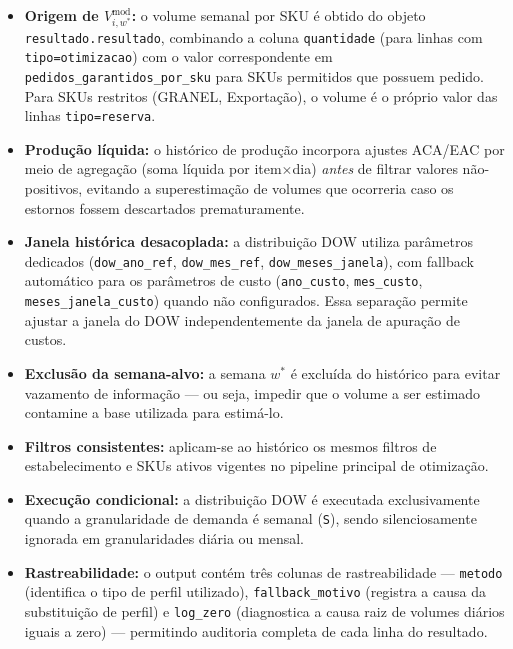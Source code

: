 \documentclass[11pt,a4paper]{article}
\begin{document}
\begin{itemize}
    \item \textbf{Origem de $V^{\text{mod}}_{i,w^*}$:} o volume semanal por
        SKU é obtido do objeto \texttt{resultado.resultado}, combinando a
        coluna \texttt{quantidade} (para linhas com \texttt{tipo=otimizacao})
        com o valor correspondente em \texttt{pedidos\_garantidos\_por\_sku}
        para SKUs permitidos que possuem pedido. Para SKUs restritos
        (GRANEL, Exportação), o volume é o próprio valor das linhas
        \texttt{tipo=reserva}.
    \item \textbf{Produção líquida:} o histórico de produção incorpora ajustes
        ACA/EAC por meio de agregação (soma líquida por item$\times$dia)
        \emph{antes} de filtrar valores não-positivos, evitando a
        superestimação de volumes que ocorreria caso os estornos fossem
        descartados prematuramente.
    \item \textbf{Janela histórica desacoplada:} a distribuição DOW utiliza
        parâmetros dedicados (\texttt{dow\_ano\_ref}, \texttt{dow\_mes\_ref},
        \texttt{dow\_meses\_janela}), com fallback automático para os
        parâmetros de custo (\texttt{ano\_custo}, \texttt{mes\_custo},
        \texttt{meses\_janela\_custo}) quando não configurados. Essa
        separação permite ajustar a janela do DOW independentemente da
        janela de apuração de custos.
    \item \textbf{Exclusão da semana-alvo:} a semana $w^*$ é excluída do
        histórico para evitar vazamento de informação --- ou seja, impedir
        que o volume a ser estimado contamine a base utilizada para estimá-lo.
    \item \textbf{Filtros consistentes:} aplicam-se ao histórico os mesmos
        filtros de estabelecimento e SKUs ativos vigentes no pipeline
        principal de otimização.
    \item \textbf{Execução condicional:} a distribuição DOW é executada
        exclusivamente quando a granularidade de demanda é semanal
        (\texttt{S}), sendo silenciosamente ignorada em granularidades
        diária ou mensal.
    \item \textbf{Rastreabilidade:} o output contém três colunas de
        rastreabilidade --- \texttt{metodo} (identifica o tipo de perfil
        utilizado), \texttt{fallback\_motivo} (registra a causa da
        substituição de perfil) e \texttt{log\_zero} (diagnostica a causa
        raiz de volumes diários iguais a zero) --- permitindo auditoria
        completa de cada linha do resultado.
\end{itemize}
\end{document}
